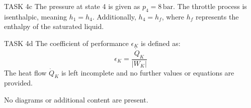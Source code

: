 TASK 4c  
The pressure at state 4 is given as \( p_4 = 8 \, \text{bar} \).  
The throttle process is isenthalpic, meaning \( h_1 = h_4 \).  
Additionally, \( h_4 = h_f \), where \( h_f \) represents the enthalpy of the saturated liquid.  

TASK 4d  
The coefficient of performance \( \epsilon_K \) is defined as:  
\[
\epsilon_K = \frac{\dot{Q}_K}{|W_K|}
\]  
The heat flow \( \dot{Q}_K \) is left incomplete and no further values or equations are provided.  

No diagrams or additional content are present.